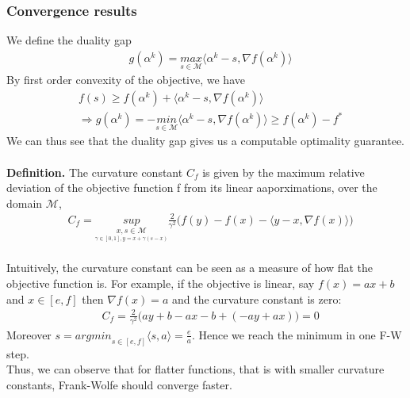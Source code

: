 \documentclass{article}
\begin{document}
\subsubsection{Convergence results}
We define the duality gap
\begin{equation*}
\begin{aligned}
    &g(\alpha^{k})= \underset{s\in\mathcal{M}}{\textit{max}}\langle \alpha^{k}-s, \nabla f(\alpha^{k})\rangle
\end{aligned}
\end{equation*}
By first order convexity of the objective, we have
\begin{equation*}
\begin{aligned}
    &f(s)\geq f(\alpha^{k})+ \langle \alpha^{k}-s, \nabla f(\alpha^{k})\rangle\\
    &\Longrightarrow g(\alpha^{k})= -\underset{s\in\mathcal{M}}{\textit{min}}\langle \alpha^{k}-s, \nabla f(\alpha^{k})\rangle \geq f(\alpha^{k})- f^{*}
\end{aligned}
\end{equation*}
We can thus see that the duality gap gives us a computable optimality guarantee. 
\\
\\
\textbf{Definition.} The curvature constant $C_{f}$ is given by the maximum relative deviation of the objective function f from its linear aaporximations, over the domain $\mathcal{M}$,
\begin{equation*}
\begin{aligned}
    &C_{f}= \underset{\underset{ \gamma\in[0,1], y=x+\gamma(s-x)}{x,s\in\mathcal{M}}}{sup}\frac{2}{\gamma^{2}}\Big(f(y)- f(x)- \langle y-x, \nabla f(x)\rangle\Big)
\end{aligned}
\end{equation*}
\\
Intuitively, the curvature constant can be seen as a measure of how flat the objective function is. For example, if the objective is linear, say $f(x)= ax+ b$ and $x\in[e,f]$ then $\nabla f(x)= a$ and the curvature constant is zero:
\begin{equation*}
\begin{aligned}
    &C_{f}= \frac{2}{\gamma^{2}}\Big(ay+ b- ax- b +(-ay +ax)\Big)= 0
\end{aligned}
\end{equation*}
Moreover $s=\textit{argmin}_{s\in[e,f]}\langle s, a\rangle= \frac{e}{a}$. Hence we reach the minimum in one F-W step.\\
Thus, we can observe that for flatter functions, that is with smaller curvature constants, Frank-Wolfe should converge faster.
\end{document}

